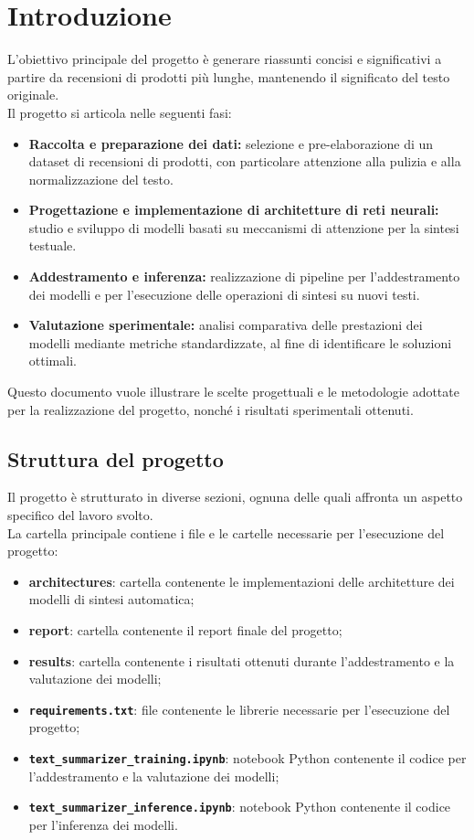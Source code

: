 \section{Introduzione}
L'obiettivo principale del progetto è generare riassunti concisi e significativi a partire da recensioni di prodotti più lunghe, mantenendo il significato del testo originale.\\
Il progetto si articola nelle seguenti fasi:
\begin{itemize}
    \item \textbf{Raccolta e preparazione dei dati:} selezione e pre-elaborazione di un dataset di recensioni di prodotti, con particolare attenzione alla pulizia e alla normalizzazione del testo.
    \item \textbf{Progettazione e implementazione di architetture di reti neurali:} studio e sviluppo di modelli basati su meccanismi di attenzione per la sintesi testuale.
    \item \textbf{Addestramento e inferenza:} realizzazione di pipeline per l'addestramento dei modelli e per l'esecuzione delle operazioni di sintesi su nuovi testi.
    \item \textbf{Valutazione sperimentale:} analisi comparativa delle prestazioni dei modelli mediante metriche standardizzate, al fine di identificare le soluzioni ottimali.
\end{itemize}
Questo documento vuole illustrare le scelte progettuali e le metodologie adottate per la realizzazione del progetto, nonché i risultati sperimentali ottenuti.

\subsection{Struttura del progetto}
Il progetto è strutturato in diverse sezioni, ognuna delle quali affronta un aspetto specifico del lavoro svolto.\\
La cartella principale contiene i file e le cartelle necessarie per l'esecuzione del progetto:
\begin{itemize}
    \item \textbf{architectures}: cartella contenente le implementazioni delle architetture dei modelli di sintesi automatica;
    \item \textbf{report}: cartella contenente il report finale del progetto;
    \item \textbf{results}: cartella contenente i risultati ottenuti durante l'addestramento e la valutazione dei modelli;
    \item \textbf{\texttt{requirements.txt}}: file contenente le librerie necessarie per l'esecuzione del progetto;
    \item \textbf{\texttt{text\_summarizer\_training.ipynb}}: notebook Python contenente il codice per l'addestramento e la valutazione dei modelli;
    \item \textbf{\texttt{text\_summarizer\_inference.ipynb}}: notebook Python contenente il codice per l'inferenza dei modelli.
\end{itemize}
